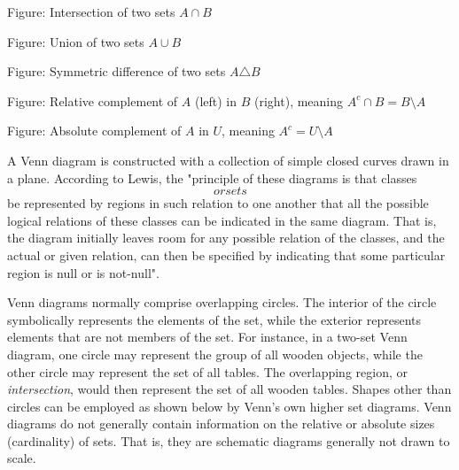 


Figure: Intersection of two sets $A \cap B$






Figure: Union of two sets $A \cup B$






Figure: Symmetric difference of two sets $A \triangle B$






Figure: Relative complement of $A$ (left) in $B$ (right), meaning $A^c \cap B = B \setminus A$






Figure: Absolute complement of $A$ in $U$, meaning $A^c = U \setminus A$



A Venn diagram is constructed with a collection of simple closed curves drawn in a plane.
According to Lewis, the "principle of these diagrams is that classes \[or \textit{sets}\]
be represented by regions in such relation to one another that all the possible logical
relations of these classes can be indicated in the same diagram. That is, the diagram
initially leaves room for any possible relation of the classes, and the actual or given
relation, can then be specified by indicating that some particular region is null or is
not-null".



Venn diagrams normally comprise overlapping circles. The interior of the circle
symbolically represents the elements of the set, while the exterior represents elements
that are not members of the set. For instance, in a two-set Venn diagram, one circle may
represent the group of all wooden objects, while the other circle may represent the set of
all tables. The overlapping region, or \textit{intersection}, would then represent the set
of all wooden tables. Shapes other than circles can be employed as shown below by Venn's
own higher set diagrams. Venn diagrams do not generally contain information on the
relative or absolute sizes (cardinality) of sets. That is, they are schematic diagrams
generally not drawn to scale.



